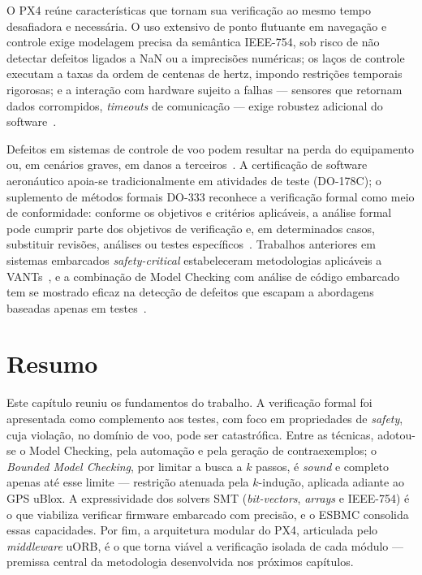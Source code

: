 O PX4 reúne características que tornam sua verificação ao mesmo tempo desafiadora e
necessária. O uso extensivo de ponto flutuante em navegação e controle exige
modelagem precisa da semântica IEEE-754, sob risco de não detectar defeitos
ligados a NaN ou a imprecisões numéricas; os laços de controle executam a taxas da
ordem de centenas de hertz, impondo restrições temporais rigorosas; e a interação
com hardware sujeito a falhas --- sensores que retornam dados corrompidos,
\textit{timeouts} de comunicação --- exige robustez adicional do
software~\cite{Wanner2024}.

Defeitos em sistemas de controle de voo podem resultar na perda do equipamento
ou, em cenários graves, em danos a terceiros~\cite{Siddiqi2022, Mekdad2023}. A
certificação de software aeronáutico apoia-se tradicionalmente em atividades de
teste (DO-178C); o suplemento de métodos formais DO-333 reconhece a verificação
formal como meio de conformidade: conforme os objetivos e critérios aplicáveis, a
análise formal pode cumprir parte dos objetivos de verificação e, em determinados
casos, substituir revisões, análises ou testes específicos~\cite{RTCA_DO178C,
RTCA_DO333}. Trabalhos
anteriores em sistemas embarcados \textit{safety-critical} estabeleceram
metodologias aplicáveis a VANTs~\cite{Mzid2024}, e a combinação de Model Checking
com análise de código embarcado tem se mostrado eficaz na detecção de defeitos que
escapam a abordagens baseadas apenas em testes~\cite{Khairullah2022, Sousa2026}.

\section{Resumo}

Este capítulo reuniu os fundamentos do trabalho. A verificação formal foi
apresentada como complemento aos testes, com foco em propriedades de
\textit{safety}, cuja violação, no domínio de voo, pode ser catastrófica. Entre as
técnicas, adotou-se o Model Checking, pela automação e pela geração de
contraexemplos; o \textit{Bounded Model Checking}, por limitar a busca a $k$
passos, é \textit{sound} e completo apenas até esse limite --- restrição atenuada
pela $k$-indução, aplicada adiante ao GPS uBlox. A expressividade dos solvers SMT
(\textit{bit-vectors}, \textit{arrays} e IEEE-754) é o que viabiliza verificar
firmware embarcado com precisão, e o ESBMC consolida essas capacidades. Por fim, a
arquitetura modular do PX4, articulada pelo \textit{middleware} uORB, é o que
torna viável a verificação isolada de cada módulo --- premissa central da
metodologia desenvolvida nos próximos capítulos.
